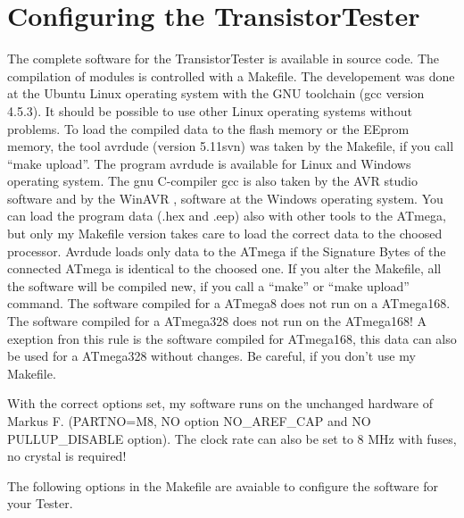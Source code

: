 \chapter{Configuring the TransistorTester}
\label{sec:config}
The complete software for the TransistorTester is available in source code.
The compilation of modules is controlled with a Makefile. The developement was done
at the Ubuntu Linux operating system with the GNU toolchain (gcc version 4.5.3).
It should be possible to use other Linux operating systems without problems.
To load the compiled data to the flash memory or
the EEprom memory, the tool avrdude (version 5.11svn) was taken by the Makefile, if you call ``make upload''.
 The program avrdude is available for Linux and Windows operating system.
The gnu C-compiler gcc is also taken by the AVR studio software and
by the WinAVR \cite{winavr1},\cite{winavr2} software at the Windows operating system.
You can load the program data (.hex and .eep) also with other tools to the ATmega,
but only my Makefile version takes care to load the correct data to the choosed processor.
Avrdude loads only data to the ATmega if the Signature Bytes of the connected ATmega is
identical to the choosed one. 
If you alter the Makefile, all the software will be compiled new, if you call a ``make'' or
``make upload'' command. The software compiled for a ATmega8 does not run on a ATmega168.
The software compiled for a ATmega328 does not run on the ATmega168! 
A exeption fron this rule is the software compiled for ATmega168, this data can also be used
for a ATmega328 without changes.
Be careful, if you don't use my Makefile.

With the correct options set, my software runs on the unchanged hardware of Markus F.
(PARTNO=M8, NO option NO\_AREF\_CAP and NO PULLUP\_DISABLE option).
The clock rate can also be set to 8 MHz with fuses, no crystal is required!


The following options in the Makefile are avaiable to configure the software for your Tester.

